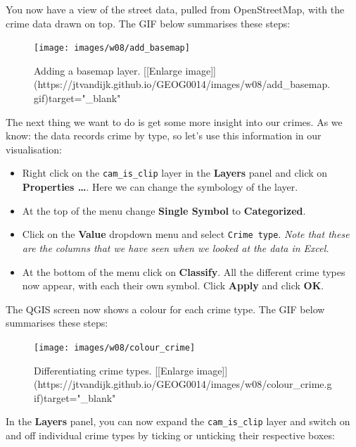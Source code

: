 \documentclass[
]{book}
\providecommand{\tightlist}{%
  \setlength{\itemsep}{0pt}\setlength{\parskip}{0pt}}
\begin{document}
You now have a view of the street data, pulled from OpenStreetMap, with the crime data drawn on top. The GIF below summarises these steps:

\begin{figure}

{\centering \texttt{[image: images/w08/add\_basemap]} 

}

\caption{Adding a basemap layer. [[Enlarge image]](https://jtvandijk.github.io/GEOG0014/images/w08/add_basemap.gif){target="_blank"}}\label{fig:adding-basemap}
\end{figure}

The next thing we want to do is get some more insight into our crimes. As we know: the data records crime by type, so let's use this information in our visualisation:

\begin{itemize}
\tightlist
\item
  Right click on the \texttt{cam\_is\_clip} layer in the \textbf{Layers} panel and click on \textbf{Properties \ldots{}}. Here we can change the symbology of the layer.
\item
  At the top of the menu change \textbf{Single Symbol} to \textbf{Categorized}.
\item
  Click on the \textbf{Value} dropdown menu and select \texttt{Crime\ type}. \emph{Note that these are the columns that we have seen when we looked at the data in Excel.}
\item
  At the bottom of the menu click on \textbf{Classify}. All the different crime types now appear, with each their own symbol. Click \textbf{Apply} and click \textbf{OK}.
\end{itemize}

The QGIS screen now shows a colour for each crime type. The GIF below summarises these steps:

\begin{figure}

{\centering \texttt{[image: images/w08/colour\_crime]} 

}

\caption{Differentiating crime types. [[Enlarge image]](https://jtvandijk.github.io/GEOG0014/images/w08/colour_crime.gif){target="_blank"}}\label{fig:colour-crimes}
\end{figure}

In the \textbf{Layers} panel, you can now expand the \texttt{cam\_is\_clip} layer and switch on and off individual crime types by ticking or unticking their respective boxes:
\end{document}
